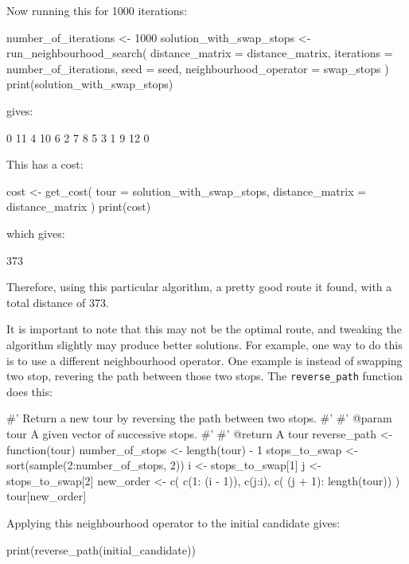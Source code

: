 Now running this for 1000 iterations:

\begin{Rin}
number_of_iterations <- 1000
solution_with_swap_stops <- run_neighbourhood_search(
    distance_matrix = distance_matrix,
    iterations = number_of_iterations,
    seed = seed,
    neighbourhood_operator = swap_stops
)
print(solution_with_swap_stops)
\end{Rin}

gives:

\begin{Rout}
 [1]  0 11  4 10  6  2  7  8  5  3  1  9 12  0
\end{Rout}

This has a cost:

\begin{Rin}
cost <- get_cost(
    tour = solution_with_swap_stops,
    distance_matrix = distance_matrix
)
print(cost)
\end{Rin}

which gives:

\begin{Rout}
[1] 373
\end{Rout}

Therefore, using this particular algorithm, a pretty good route it found, with a
total distance of 373.

It is important to note that this may not be the optimal route, and tweaking the
algorithm slightly may produce better solutions.
For example, one way to do this is to use a different neighbourhood operator.
One example is instead of swapping two stop, revering the path between those two
stops. The \texttt{reverse_path} function does this:


\begin{Rin}
#' Return a new tour by reversing the path between two stops.
#'
#' @param tour A given vector of successive stops.
#'
#' @return A tour
reverse_path <- function(tour){
    number_of_stops <- length(tour) - 1
    stops_to_swap <- sort(sample(2:number_of_stops, 2))
    i <- stops_to_swap[1]
    j <- stops_to_swap[2]
    new_order <- c(
            c(1: (i - 1)),
            c(j:i),
            c( (j + 1): length(tour))
            )
    tour[new_order]
    }
\end{Rin}

Applying this neighbourhood operator to the initial candidate gives:

\begin{Rin}
print(reverse_path(initial_candidate))
\end{Rin}

